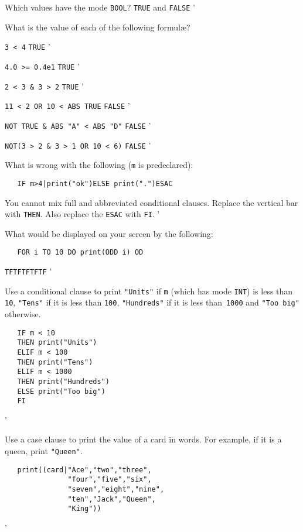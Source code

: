 \begin{exercise}
\item Which values have the mode \verb|BOOL|? \ans \verb|TRUE| and
\verb|FALSE|
'
\item What is the value of each of the following formul{\ae}?
\begin{subex}
\item \verb|3 < 4| \subans \verb|TRUE|
'
\item \verb|4.0 >= 0.4e1| \subans \verb|TRUE|
'
\item \verb|2 < 3 & 3 > 2| \subans \verb|TRUE|
'
\item \verb|11 < 2 OR 10 < ABS TRUE| \subans \verb|FALSE|
'
\item \verb|NOT TRUE & ABS "A" < ABS "D"| \subans \verb|FALSE|
'
\item \verb|NOT(3 > 2 & 3 > 1 OR 10 < 6)| \subans \verb|FALSE|
'
\end{subex}
\item What is wrong with the following (\verb|m| is predeclared):
\begin{verbatim}
   IF m>4|print("ok")ELSE print(".")ESAC
\end{verbatim}
\indent\ans You cannot mix full and abbreviated con\-di\-tional
clau\-ses.  Replace the vertical bar with \verb|THEN|. Also replace the
\verb|ESAC| with \verb|FI|.
'
\item What would be displayed on your screen by the following:
\begin{verbatim}
   FOR i TO 10 DO print(ODD i) OD
\end{verbatim}
\indent\ans \verb|TFTFTFTFTF|
'
\item Use a conditional clause to print \verb|"Units"| if \verb|m|
(which has mode \verb|INT|) is less than \verb|10|, \verb|"Tens"| if
it is less than \verb|100|, \verb|"Hundreds"| if it is less
than~\verb|1000| and \verb|"Too big"| otherwise. \ans \ %
\begin{verbatim}
   IF m < 10
   THEN print("Units")
   ELIF m < 100
   THEN print("Tens")
   ELIF m < 1000
   THEN print("Hundreds")
   ELSE print("Too big")
   FI
\end{verbatim}
'
\item Use a case clause to print the value of a card in words. For
example, if it is a queen, print \verb|"Queen"|.
\ans \ %
\begin{verbatim}
   print((card|"Ace","two","three",
               "four","five","six",
               "seven","eight","nine",
               "ten","Jack","Queen",
               "King"))
\end{verbatim}
'
\end{exercise}
